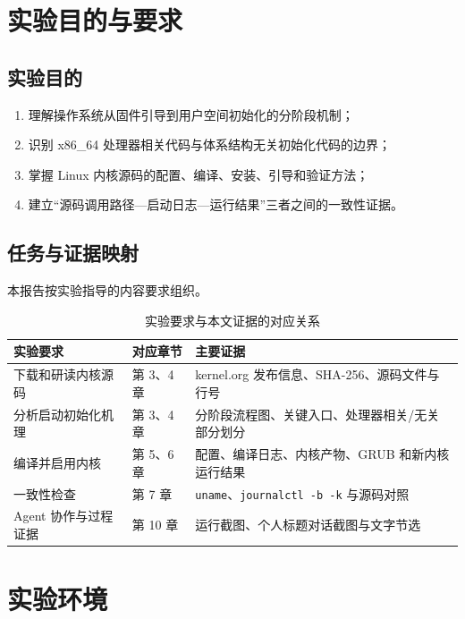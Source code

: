 \documentclass[UTF8,zihao=-4,openany,fontset=none]{ctexrep}
\begin{document}
\tableofcontents

\chapter{实验目的与要求}

\section{实验目的}
\begin{enumerate}[label=(\arabic*)]
  \item 理解操作系统从固件引导到用户空间初始化的分阶段机制；
  \item 识别 x86\_64 处理器相关代码与体系结构无关初始化代码的边界；
  \item 掌握 Linux 内核源码的配置、编译、安装、引导和验证方法；
  \item 建立“源码调用路径—启动日志—运行结果”三者之间的一致性证据。
\end{enumerate}

\section{任务与证据映射}
本报告按实验指导的内容要求组织\cite{guide}。
\begin{table}[H]
  \centering
  \caption{实验要求与本文证据的对应关系}
  \begin{tabularx}{\textwidth}{p{}p{}X}
    \toprule
    实验要求 & 对应章节 & 主要证据 \\
    \midrule
    下载和研读内核源码 & 第 3、4 章 & kernel.org 发布信息、SHA-256、源码文件与行号 \\
    分析启动初始化机理 & 第 3、4 章 & 分阶段流程图、关键入口、处理器相关/无关部分划分 \\
    编译并启用内核 & 第 5、6 章 & 配置、编译日志、内核产物、GRUB 和新内核运行结果 \\
    一致性检查 & 第 7 章 & \texttt{uname}、\texttt{journalctl -b -k} 与源码对照 \\
    Agent 协作与过程证据 & 第 10 章 & 运行截图、个人标题对话截图与文字节选 \\
    \bottomrule
  \end{tabularx}
\end{table}

\chapter{实验环境}
\end{document}
